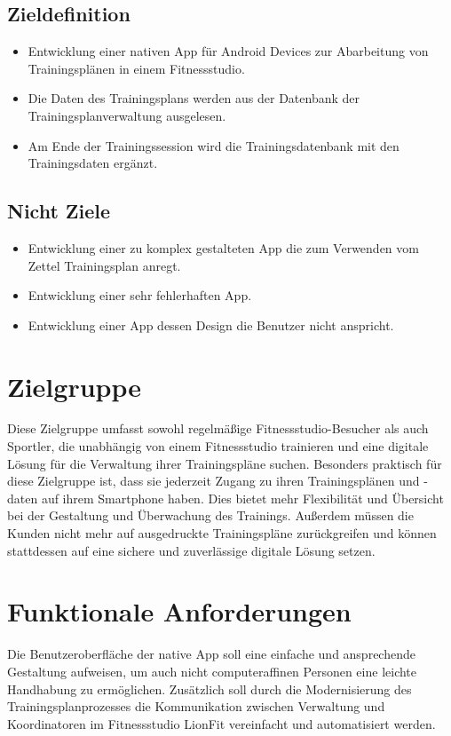 \subsection{Zieldefinition}
\begin{itemize}
    \item Entwicklung einer nativen App für Android Devices zur Abarbeitung von Trainingsplänen in einem Fitnessstudio.    
    \item Die Daten des Trainingsplans werden aus der Datenbank der Trainingsplanverwaltung ausgelesen. 
    \item Am Ende der Trainingssession wird die Trainingsdatenbank mit den Trainingsdaten ergänzt.
\end{itemize}

\subsection{Nicht Ziele}
\begin{itemize}
    \item Entwicklung einer zu komplex gestalteten App die zum Verwenden vom Zettel Trainingsplan anregt.    
    \item Entwicklung einer sehr fehlerhaften App.
    \item Entwicklung einer App dessen Design die Benutzer nicht anspricht.
\end{itemize}

\section{Zielgruppe}
Diese Zielgruppe umfasst sowohl regelmäßige Fitnessstudio-Besucher als auch Sportler, 
die unabhängig von einem Fitnessstudio trainieren und eine digitale Lösung für die Verwaltung 
ihrer Trainingspläne suchen. Besonders praktisch für diese Zielgruppe ist, dass sie jederzeit 
Zugang zu ihren Trainingsplänen und -daten auf ihrem Smartphone haben. Dies bietet mehr Flexibilität 
und Übersicht bei der Gestaltung und Überwachung des Trainings. Außerdem müssen die Kunden nicht mehr 
auf ausgedruckte Trainingspläne zurückgreifen und können stattdessen auf eine sichere und zuverlässige 
digitale Lösung setzen.

\newpage
\section{Funktionale Anforderungen}
Die Benutzeroberfläche der native App soll eine einfache und 
ansprechende Gestaltung aufweisen, um auch nicht computeraffinen Personen eine leichte 
Handhabung zu ermöglichen. Zusätzlich soll durch die Modernisierung des Trainingsplanprozesses 
die Kommunikation zwischen Verwaltung und Koordinatoren im Fitnessstudio LionFit vereinfacht 
und automatisiert werden.

